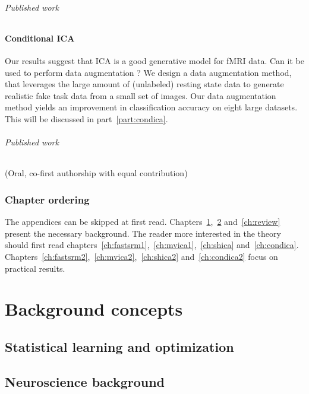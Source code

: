 \documentclass[ twoside,openright,titlepage,numbers=noenddot,%
                headinclude,footinclude,cleardoublepage=empty,abstract=on,
                BCOR=5mm,paper=a4,fontsize=11pt, 
                ]{scrreprt}
\begin{document}
\paragraph{Published work} 

\subsection{Conditional ICA}
Our results suggest that ICA is a good generative model for fMRI data. Can it be
used to perform data augmentation ? We design a data augmentation method, that
leverages the large amount of (unlabeled) resting state data to generate
realistic fake task data from a small set of images.
Our data augmentation method yields an improvement in classification accuracy on
eight large datasets. This will be discussed in part~\ref{part:condica}.

\paragraph{Published work}
 (Oral, co-first authorship with equal contribution)

\section{Chapter ordering}
The appendices can be skipped at first read.
Chapters~\ref{ch:statistical_learning},~\ref{ch:neuroscience} and~\ref{ch:review} present the necessary background.
The reader more interested in the
theory should first read
chapters~\ref{ch:fastsrm1},~\ref{ch:mvica1},~\ref{ch:shica}
and~\ref{ch:condica}. Chapters~\ref{ch:fastsrm2},~\ref{ch:mvica2},~\ref{ch:shica2}
and~\ref{ch:condica2} focus on practical results.







\part{Background concepts}
\label{part:background}
\chapter{Statistical learning and optimization}
\label{ch:statistical_learning}

\chapter{Neuroscience background}
\label{ch:neuroscience}

\end{document}
